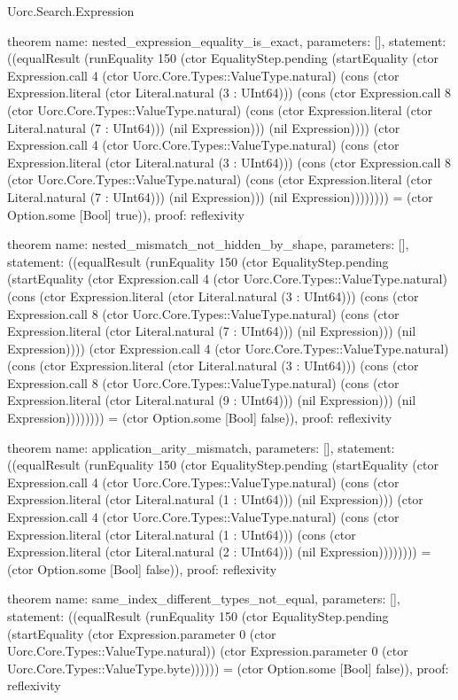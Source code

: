 \begin{lexlean}{Uorc.Search.Expression}
\begin{semanticmodule}
theorem{
  name: nested_expression_equality_is_exact,
  parameters: [],
  statement: ((equalResult (runEquality 150 (ctor EqualityStep.pending (startEquality (ctor Expression.call 4 (ctor Uorc.Core.Types::ValueType.natural) (cons (ctor Expression.literal (ctor Literal.natural (3 : UInt64))) (cons (ctor Expression.call 8 (ctor Uorc.Core.Types::ValueType.natural) (cons (ctor Expression.literal (ctor Literal.natural (7 : UInt64))) (nil Expression))) (nil Expression)))) (ctor Expression.call 4 (ctor Uorc.Core.Types::ValueType.natural) (cons (ctor Expression.literal (ctor Literal.natural (3 : UInt64))) (cons (ctor Expression.call 8 (ctor Uorc.Core.Types::ValueType.natural) (cons (ctor Expression.literal (ctor Literal.natural (7 : UInt64))) (nil Expression))) (nil Expression)))))))) = (ctor Option.some [Bool] true)),
  proof: reflexivity{}
}

theorem{
  name: nested_mismatch_not_hidden_by_shape,
  parameters: [],
  statement: ((equalResult (runEquality 150 (ctor EqualityStep.pending (startEquality (ctor Expression.call 4 (ctor Uorc.Core.Types::ValueType.natural) (cons (ctor Expression.literal (ctor Literal.natural (3 : UInt64))) (cons (ctor Expression.call 8 (ctor Uorc.Core.Types::ValueType.natural) (cons (ctor Expression.literal (ctor Literal.natural (7 : UInt64))) (nil Expression))) (nil Expression)))) (ctor Expression.call 4 (ctor Uorc.Core.Types::ValueType.natural) (cons (ctor Expression.literal (ctor Literal.natural (3 : UInt64))) (cons (ctor Expression.call 8 (ctor Uorc.Core.Types::ValueType.natural) (cons (ctor Expression.literal (ctor Literal.natural (9 : UInt64))) (nil Expression))) (nil Expression)))))))) = (ctor Option.some [Bool] false)),
  proof: reflexivity{}
}

theorem{
  name: application_arity_mismatch,
  parameters: [],
  statement: ((equalResult (runEquality 150 (ctor EqualityStep.pending (startEquality (ctor Expression.call 4 (ctor Uorc.Core.Types::ValueType.natural) (cons (ctor Expression.literal (ctor Literal.natural (1 : UInt64))) (nil Expression))) (ctor Expression.call 4 (ctor Uorc.Core.Types::ValueType.natural) (cons (ctor Expression.literal (ctor Literal.natural (1 : UInt64))) (cons (ctor Expression.literal (ctor Literal.natural (2 : UInt64))) (nil Expression)))))))) = (ctor Option.some [Bool] false)),
  proof: reflexivity{}
}

theorem{
  name: same_index_different_types_not_equal,
  parameters: [],
  statement: ((equalResult (runEquality 150 (ctor EqualityStep.pending (startEquality (ctor Expression.parameter 0 (ctor Uorc.Core.Types::ValueType.natural)) (ctor Expression.parameter 0 (ctor Uorc.Core.Types::ValueType.byte)))))) = (ctor Option.some [Bool] false)),
  proof: reflexivity{}
}
\end{semanticmodule}
\end{lexlean}
